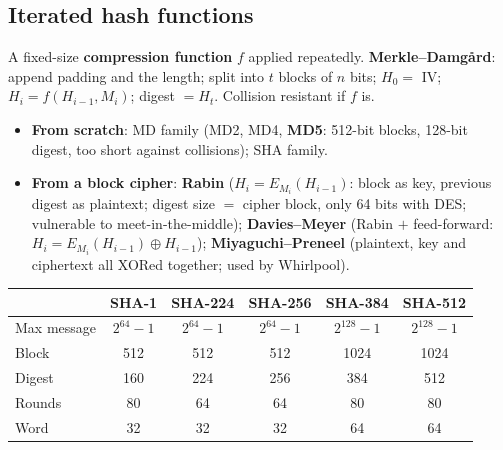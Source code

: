 \subsection{Iterated hash functions}
A fixed-size \textbf{compression function} $f$ applied repeatedly. \textbf{Merkle--Damg\aa rd}: append padding and the length; split into $t$ blocks of $n$ bits; $H_0 = $ IV; $H_i = f(H_{i-1}, M_i)$; digest $= H_t$. Collision resistant if $f$ is.
\begin{itemize}
  \item \textbf{From scratch}: MD family (MD2, MD4, \textbf{MD5}: 512-bit blocks, 128-bit digest, too short against collisions); SHA family.
  \item \textbf{From a block cipher}: \textbf{Rabin} ($H_i = E_{M_i}(H_{i-1})$: block as key, previous digest as plaintext; digest size $=$ cipher block, only 64 bits with DES; vulnerable to meet-in-the-middle); \textbf{Davies--Meyer} (Rabin $+$ feed-forward: $H_i = E_{M_i}(H_{i-1}) \oplus H_{i-1}$); \textbf{Miyaguchi--Preneel} (plaintext, key and ciphertext all XORed together; used by Whirlpool).
\end{itemize}
\begin{center}\small
\begin{tabular}{@{}lccccc@{}}
\toprule
 & SHA-1 & SHA-224 & SHA-256 & SHA-384 & SHA-512\\
\midrule
Max message & $2^{64} - 1$ & $2^{64} - 1$ & $2^{64} - 1$ & $2^{128} - 1$ & $2^{128} - 1$\\
Block & 512 & 512 & 512 & 1024 & 1024\\
Digest & 160 & 224 & 256 & 384 & 512\\
Rounds & 80 & 64 & 64 & 80 & 80\\
Word & 32 & 32 & 32 & 64 & 64\\
\bottomrule
\end{tabular}
\end{center}

